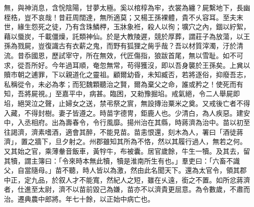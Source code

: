 \begin{pinyinscope}
無，與神消息，含恱陰陽，甘夢太極。奚以棺椁為牢，衣裳為纏？屍繫地下，長幽桎梏，豈不哀哉！昔莊周闊達，無所適莫；又楊王孫裸體，貴不乆容耳。至夫末世，緣生怨死之徒，乃有含珠鱗柙，玉牀象袵，殺人以徇；壙穴之內，錮以紵絮，藉以蜃炭，千載僵燥，託類神仙。於是大教陵遲，競於厚葬，謂莊子為放蕩，以王孫為戮屍，豈復識古有衣薪之鬼，而野有狐狸之胔乎哉？吾以材質滓濁，汙於清流。昔忝國恩，歷試宰守，所在無效，代匠傷指，狼跋首尾，無以雪耻。如不可求，從吾所好。今年過耳順，奄忽無常，苟得獲沒，即以吾身襲於王孫矣。上兾以贖巿朝之逋罪，下以親道化之靈祖。顧爾幼昏，未知臧否，若將逐俗，抑廢吾志，私稱從令，未必為孝；而犯魏顆聽治之賢，爾為棄父之命，誰或矜之！使死而有知，吾將屍視。」至嘉平中，病甚。臨困，又勑豫掘埳。戒氣絕，令二人舉屍即埳，絕哭泣之聲，止婦女之送，禁弔祭之賔，無設摶治粟米之奠。又戒後亡者不得入藏，不得封樹。妻子皆遵之。時苗字德冑，鉅鹿人也。少清白，為人疾惡。建安中，入丞相府。出為壽春令，令行風靡。揚州治在其縣，時蔣濟為治中。苗以初至往謁濟，濟素嗜酒，適會其醉，不能見苗。苗恚恨還，刻木為人，署曰「酒徒蔣濟」，置之牆下，旦夕射之。州郡雖知其所為不恪，然以其履行過人，無若之何。又其始之官，乘薄軬音飯車，黃牸牛，布被囊。居官歲餘，牛生一犢。及其去，留其犢，謂主簿曰：「令來時本無此犢，犢是淮南所生有也。」羣吏曰：「六畜不識父，自當隨母。」苗不聽，時人皆以為激，然由此名聞天下。還為太官令，領其郡中正，定九品，於叙人才不能寬，然紀人之短，雖在乆遠，銜之不置。如所忿蔣濟者，仕進至太尉，濟不以苗前毀己為嫌，苗亦不以濟貴更屈意。為令數歲，不肅而治。遷典農中郎將。年七十餘，以正始中病亡也。


\end{pinyinscope}